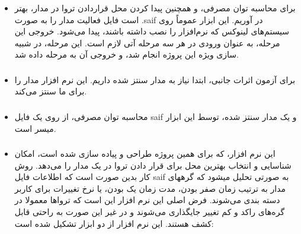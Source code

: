 \begin{itemize}
	
	\item \subsubsection{}
	برای محاسبه توان مصرفی، و همچنین پیدا کردن محل قراردادن تروا در مدار، بهتر است فایل فعالیت مدار را به صورت .saif در آوریم. این ابزار عموماً روی سیستم‌های لینوکس که نرم‌افزار 
	را نصب داشته باشند، پیدا می‌شود.
	خروجی این مرحله، به عنوان ورودی در هر سه مرحله آتی لازم است. این مرحله، در شبیه سازی ویژه این پروژه انجام شد، و خروجی آن به مرحله
	داده شد.
	\item \subsubsection{}
	برای آزمون اثرات جانبی، ابتدا نیاز به مدار سنتز شده داریم. این نرم افزار مدار را برای ما سنتز می‌کند.
	\item \subsubsection{}
	محاسبه توان مصرفی، از روی یک فایل saif و یک مدار سنتز شده، توسط این ابزار میسر است.
	\item \subsubsection{}
	این نرم افزار، که برای همین پروژه طراحی و پیاده سازی شده است، امکان شناسایی و انتخاب بهترین محل برای قرار دادن تروا در یک مدار را می‌دهد. روش کار بدین صورت است که اطلاعات فایل saif به صورتی تحلیل میشود که گرههای مدار به ترتیب زمان صفر بودن، مدت زمان یک بودن، یا نرخ تغییرات برای کاربر دسته بندی می‌شوند. فرض اصلی این نرم افزار این است که ترواها معمولا در گره‌های راکد و کم تغییر جایگذاری می‌شوند و در غیر این صورت به راحتی قابل کشف هستند. این نرم افزار از دو ابزار تشکیل شده است:
	

\end{itemize}
